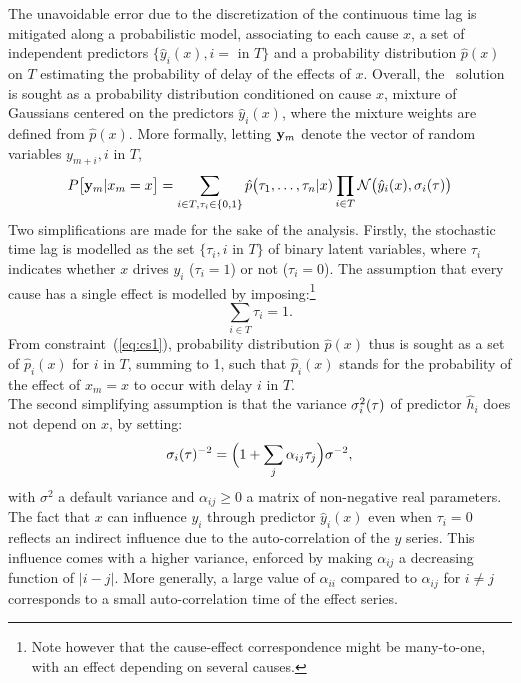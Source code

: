 The unavoidable error due to the discretization of the continuous time lag is mitigated along a probabilistic model, associating to each cause $x$, a set of independent predictors $\{\hat y_i(x),i=$ in $T\}$ and a probability distribution $\hat p(x)$ on $T$ estimating the probability of delay of the effects of $x$. Overall, the \XX\ solution is sought as a probability distribution conditioned on cause $x$, mixture of Gaussians centered on the predictors $\hat y_i(x)$, where the mixture weights are defined from $\hat p(x)$. More formally, letting ${\bf y}_m$ denote the vector of random variables $y_{m+i}, i$ in $T$, 
\begin{equation}\label{eq:py}
  P\bigl[{\bf y}_{m}\vert x_m=x\bigr] = \sum_{i \in T, \tau_i\in\{0,1\}}  \hat p\bigl(\tau_1,\ldots,\tau_n\vert x)
\prod_{i\in T} {\cal N}\bigl(\hat y_i(x),\sigma_i(\tau)\bigr)
\end{equation}
Two simplifications are made for the sake of the analysis. Firstly, the stochastic time lag is modelled as the set $\{\tau_i, i$ in $ T\}$ of binary 
latent variables, where $\tau_i$ indicates whether $x$ drives $y_i$ ($\tau_i=1$) or not ($\tau_i=0$). The assumption that every cause has a single effect is modelled by imposing:\footnote{Note however that the cause-effect correspondence might be many-to-one, with an effect depending on several causes.}
\begin{equation}\label{eq:cs1}
\sum_{i \in T} \tau_i = 1.
\end{equation}
From constraint~(\ref{eq:cs1}), probability distribution $\hat p(x)$ thus is sought as a set of $\hat p_i(x)$ for $i$ in $T$, summing to 1, such that $\hat p_i(x)$ stands for the 
probability of the effect of $x_m=x$ to occur with delay $i$ in $T$. \\
The second simplifying assumption is that the variance $\sigma_i^2({\bf \tau})$ of predictor $\hat h_i$ does not depend on $x$, by setting:
\[
\sigma_i({\bf \tau})^{-2} = \Bigl(1+\sum_j\alpha_{ij} \tau_j\Bigr)\sigma^{-2},
\]
with $\sigma^2$ a default variance and $\alpha_{ij}\ge 0$ a matrix of non-negative real parameters. 
The fact that $x$ can influence $y_i$ through predictor $\hat y_i(x)$ even when $\tau_i=0$ reflects an indirect
influence due to the auto-correlation of the $y$ series. This influence comes with a higher variance, enforced by making 
$\alpha_{ij}$ a decreasing function of $\vert i-j\vert$. More generally, a large value of $\alpha_{ii}$ compared to $\alpha_{ij}$ for $i\ne j$ corresponds to a small auto-correlation time of the effect series. 


